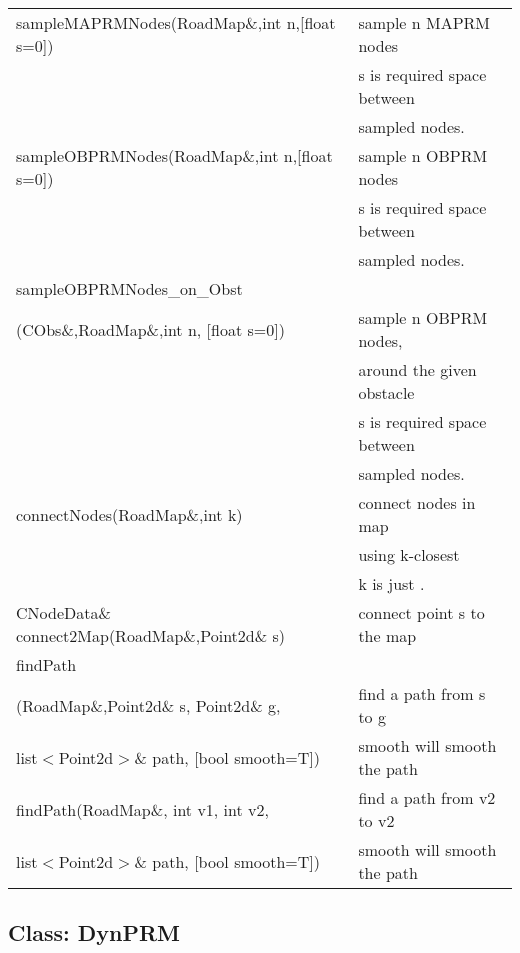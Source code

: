 \documentclass[onecolumn,10pt]{article}
\begin{document}
\begin{tabular}{l|l}
sampleMAPRMNodes(RoadMap\&,int n,[float s=0])   & sample n MAPRM nodes \\
                                                 & s is required space between \\
						 & sampled nodes. \\\hline
						 
sampleOBPRMNodes(RoadMap\&,int n,[float s=0])   & sample n OBPRM nodes \\
                                                 & s is required space between \\
						 & sampled nodes. \\\hline
sampleOBPRMNodes\_on\_Obst & \\						 
(CObs\&,RoadMap\&,int n, {[}float s=0{]})        & sample n OBPRM nodes, \\
                                                   & around the given obstacle \\
			                           & s is required space between \\
						   & sampled nodes. \\\hline
						 
connectNodes(RoadMap\&,int k)                    & connect nodes in map  \\
                                                  & using k-closest \\
						  & k is just . \\\hline

CNodeData\& connect2Map(RoadMap\&,Point2d\& s)    & connect point s to the map \\\hline

findPath & \\
(RoadMap\&,Point2d\& s, Point2d\& g,        &  find a path from s to g \\
         list$<$Point2d$>$\& path, [bool smooth=T])  & smooth will smooth the path \\\hline

findPath(RoadMap\&, int v1, int v2,                & find a path from v2 to v2\\
         list$<$Point2d$>$\& path, [bool smooth=T])  & smooth will smooth the path

\end{tabular}

\subsection{Class: DynPRM}
\end{document}
